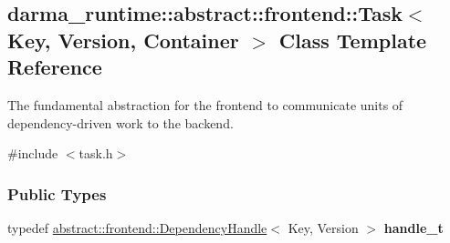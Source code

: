\hypertarget{classdarma__runtime_1_1abstract_1_1frontend_1_1_task}{}\subsection{darma\+\_\+runtime\+:\+:abstract\+:\+:frontend\+:\+:Task$<$ Key, Version, Container $>$ Class Template Reference}
\label{classdarma__runtime_1_1abstract_1_1frontend_1_1_task}


The fundamental abstraction for the frontend to communicate units of dependency-\/driven work to the backend.  




{\ttfamily \#include $<$task.\+h$>$}

\subsubsection*{Public Types}
\begin{DoxyCompactItemize}
\item 
typedef \hyperlink{classdarma__runtime_1_1abstract_1_1frontend_1_1_dependency_handle}{abstract\+::frontend\+::\+Dependency\+Handle}$<$ Key, Version $>$ {\bfseries handle\+\_\+t}\hypertarget{classdarma__runtime_1_1abstract_1_1frontend_1_1_task_af6a67173383df0843204f1200f86b945}{}\label{classdarma__runtime_1_1abstract_1_1frontend_1_1_task_af6a67173383df0843204f1200f86b945}

\end{DoxyCompactItemize}
